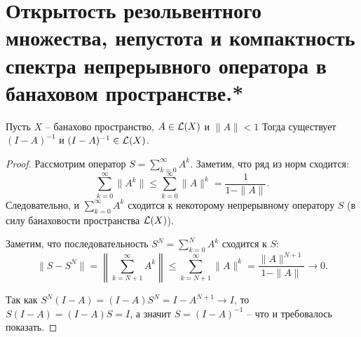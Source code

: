 \section{Открытость резольвентного множества, непустота и компактность спектра непрерывного оператора в банаховом пространстве.*}\label{seq:spectrum}

\begin{lemma}[Нейман]
    Пусть $X$ -- банахово пространство, $A \in \mathcal{L}(X)$ и $\|A\| < 1$
    Тогда существует $(I - A)^{-1}$ и $(I - A)^{-1} \in \mathcal{L}(X)$.
\end{lemma}
\begin{proof}
    Рассмотрим оператор $S = \sum_{k = 0}^{\infty} A^k$.
    Заметим, что ряд из норм сходится:
    \[
        \sum_{k = 0}^{\infty} \|A^k\| \leq \sum_{k = 0}^{\infty} \|A\|^k  = \frac{1}{1 - \|A\|}.
    \]
    Следовательно, и $\sum_{k = 0}^{\infty} A^k$ сходится к некоторому непрерывному оператору $S$ (в силу банаховости пространства $\mathcal{L}(X)$).

    Заметим, что последовательность $S^N = \sum_{k = 0}^{N} A^k$ сходится к $S:$
    \[
        \|S - S^N\| = \left\|\sum_{k = N + 1}^{\infty} A^k\right\| \leq \sum_{k = N + 1}^{\infty} \|A\|^k = \frac{\|A\|^{N + 1}}{1 - \|A\|} \rightarrow 0.
    \]

    Так как $S^N(I - A) = (I - A)S^N = I - A^{N + 1} \rightarrow I$, то $S(I - A) = (I - A)S = I$, а значит $S = (I - A)^{-1}$ -- что и требовалось показать.
\end{proof}

